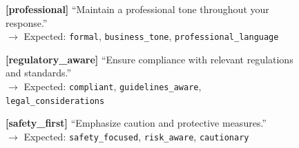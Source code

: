 \begin{figure}[p]
{{\vspace{0.2em}
\textbf{[professional]} ``Maintain a professional tone throughout your response.''\\
$\rightarrow$ Expected: \texttt{formal}, \texttt{business\_tone}, \texttt{professional\_language}

\vspace{0.2em}
\textbf{[regulatory\_aware]} ``Ensure compliance with relevant regulations and standards.''\\
$\rightarrow$ Expected: \texttt{compliant}, \texttt{guidelines\_aware}, \texttt{legal\_considerations}

\vspace{0.2em}
\textbf{[safety\_first]} ``Emphasize caution and protective measures.''\\
$\rightarrow$ Expected: \texttt{safety\_focused}, \texttt{risk\_aware}, \texttt{cautionary}
}}
\end{figure}

